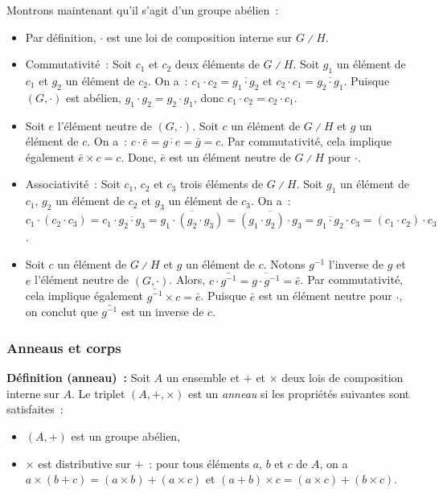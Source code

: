     Montrons maintenant qu'il s'agit d'un groupe abélien : 
    \begin{itemize}[nosep]
        \item Par définition, $\cdot$ est une loi de composition interne sur $G \divslash H$.
        \item Commutativité : Soit $c_1$ et $c_2$ deux éléments de $G \divslash H$.
            Soit $g_1$ un élément de $c_1$ et $g_2$ un élément de $c_2$. 
            On a : $c_1 \cdot c_2 = \overline{g_1 \cdot g_2}$ et $c_2 \cdot c_1 = \overline{g_2 \cdot g_1}$.
            Puisque $(G, \cdot)$ est abélien, $g_1 \cdot g_2 = g_2 \cdot g_1$, donc $c_1 \cdot c_2 = c_2 \cdot c_1$.
        \item Soit $e$ l'élément neutre de $(G, \cdot)$. 
            Soit $c$ un élément de $G \divslash H$ et $g$ un élément de $c$. 
            On a : $c \cdot \bar{e} = \overline{g \cdot e} = \bar{g} = c$.
            Par commutativité, cela implique également $\bar{e} \times c = c$.
            Donc, $\bar{e}$ est un élément neutre de $G \divslash H$ pour $\cdot$.
        \item Associativité : Soit $c_1$, $c_2$ et $c_3$ trois éléments de $G \divslash H$.
            Soit $g_1$ un élément de $c_1$, $g_2$ un élément de $c_2$ et $g_3$ un élément de $c_3$.
            On a : $c_1 \cdot (c_2 \cdot c_3) = c_1 \cdot \overline{g_2 \cdot g_3} = \overline{g_1 \cdot (g_2 \cdot g_3)} = \overline{(g_1 \cdot g_2) \cdot g_3} = \overline{g_1 \cdot g_2} \cdot c_3 = (c_1 \cdot c_2) \cdot c_3$.
        \item Soit $c$ un élément de $G \divslash H$ et $g$ un élément de $c$. 
            Notons $g^{-1}$ l'inverse de $g$ et $e$ l'élément neutre de $(G,\cdot)$. 
            Alors, $c \cdot \bar{g^{-1}} = \overline{g \cdot g^{-1}} = \bar{e}$.
            Par commutativité, cela implique également $\bar{g^{-1}} \times c = \bar{e}$.
            Puisque $\bar{e}$ est un élément neutre pour $\cdot$, on conclut que $\bar{g^{-1}}$ est un inverse de $c$.
    \end{itemize}

    \done

\subsubsection{Anneaus et corps}

\noindent\textbf{Définition (anneau) :} Soit $A$ un ensemble et $+$ et $\times$ deux lois de composition interne sur $A$. 
    Le triplet $(A, +, \times)$ est un \textit{anneau} si les propriétés suivantes sont satisfaites : 
    \begin{itemize}[nosep]
        \item $(A,+)$ est un groupe abélien,
        \item $\times$ est distributive sur $+$ : pour tous éléments $a$, $b$ et $c$ de $A$, on a $a \times (b + c) = (a \times b) + (a \times c)$ et $(a + b) \times c = (a \times c) + (b \times c)$.
    \end{itemize}

